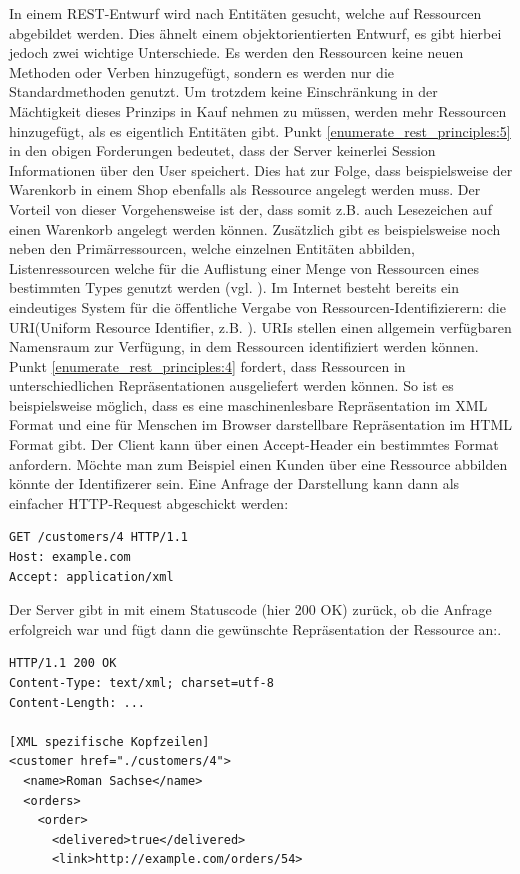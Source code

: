 In einem REST-Entwurf wird nach Entitäten gesucht, welche auf Ressourcen abgebildet werden. Dies ähnelt einem objektorientierten Entwurf, es gibt hierbei jedoch zwei wichtige Unterschiede. Es werden den Ressourcen keine neuen Methoden oder Verben hinzugefügt, sondern es werden nur die Standardmethoden genutzt. Um trotzdem keine Einschränkung in der Mächtigkeit dieses Prinzips in Kauf nehmen zu müssen, werden mehr Ressourcen hinzugefügt, als es eigentlich Entitäten gibt. Punkt \ref{enumerate_rest_principles:5} in den obigen Forderungen bedeutet, dass der Server keinerlei Session Informationen über den User speichert. Dies hat zur Folge, dass beispielsweise der Warenkorb in einem Shop ebenfalls als Ressource angelegt werden muss. Der Vorteil von dieser Vorgehensweise ist der, dass somit z.B. auch Lesezeichen auf einen Warenkorb angelegt werden können. Zusätzlich gibt es beispielsweise noch neben den Primärressourcen, welche einzelnen Entitäten abbilden, Listenressourcen welche für die Auflistung einer Menge von Ressourcen eines bestimmten Types genutzt werden (vgl. \cite{tilkovrestchapter4}). Im Internet besteht bereits ein eindeutiges System für die öffentliche Vergabe von Ressourcen-Identifizierern: die URI(Uniform Resource Identifier, z.B. ). URIs stellen einen allgemein verfügbaren Namensraum zur Verfügung, in dem Ressourcen identifiziert werden können. Punkt \ref{enumerate_rest_principles:4} fordert, dass Ressourcen in unterschiedlichen Repräsentationen ausgeliefert werden können. So ist es beispielsweise möglich, dass es eine maschinenlesbare Repräsentation im XML Format und eine für Menschen im Browser darstellbare Repräsentation im HTML Format gibt. Der Client kann über einen Accept-Header ein bestimmtes Format anfordern.
Möchte man zum Beispiel einen Kunden über eine Ressource abbilden könnte der Identifizerer  sein. Eine Anfrage der Darstellung kann dann als einfacher HTTP-Request abgeschickt werden:
\begin{lstlisting}
GET /customers/4 HTTP/1.1
Host: example.com
Accept: application/xml 
\end{lstlisting}
Der Server gibt in mit einem Statuscode (hier 200 OK) zurück, ob die Anfrage erfolgreich war und fügt dann die gewünschte Repräsentation der Ressource an:.
\begin{lstlisting}
HTTP/1.1 200 OK
Content-Type: text/xml; charset=utf-8
Content-Length: ...

[XML spezifische Kopfzeilen]
<customer href="./customers/4">
  <name>Roman Sachse</name>
  <orders>
    <order>
      <delivered>true</delivered>
      <link>http://example.com/orders/54>
\end{lstlisting}
